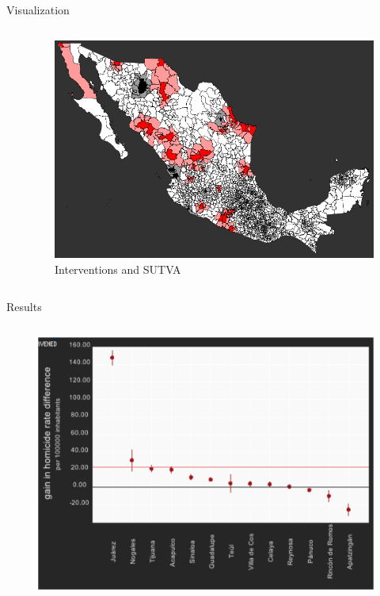 \documentclass[final]{beamer}
\newlength{\onecolwid}
\newlength{\twocolwid}
\begin{document}
\begin{frame}[t]
\begin{columns}[t]
\begin{column}{\twocolwid}
\begin{block}{ Visualization }
\begin{columns}[t,totalwidth=\twocolwid]
\begin{column}{\onecolwid}
          \end{column}
   			\begin{column}{\onecolwid}
             \begin{figure}[htdp]
 	              \includegraphics[scale=0.95]{intervened.png}
	              \caption*{Interventions and SUTVA}
            \end{figure}
          \end{column}
		\end{columns}
	\end{block}
	\begin{block}{Results}
		\begin{columns}[t,totalwidth=\twocolwid]
	          \begin{column}{\onecolwid}
	            \begin{figure}[htdp]
	              \includegraphics[scale=0.9]{../Images/results.png}

\end{figure}
\end{column}
\end{columns}
\end{block}
\end{column}
\end{columns}
\end{frame}
\end{document}
